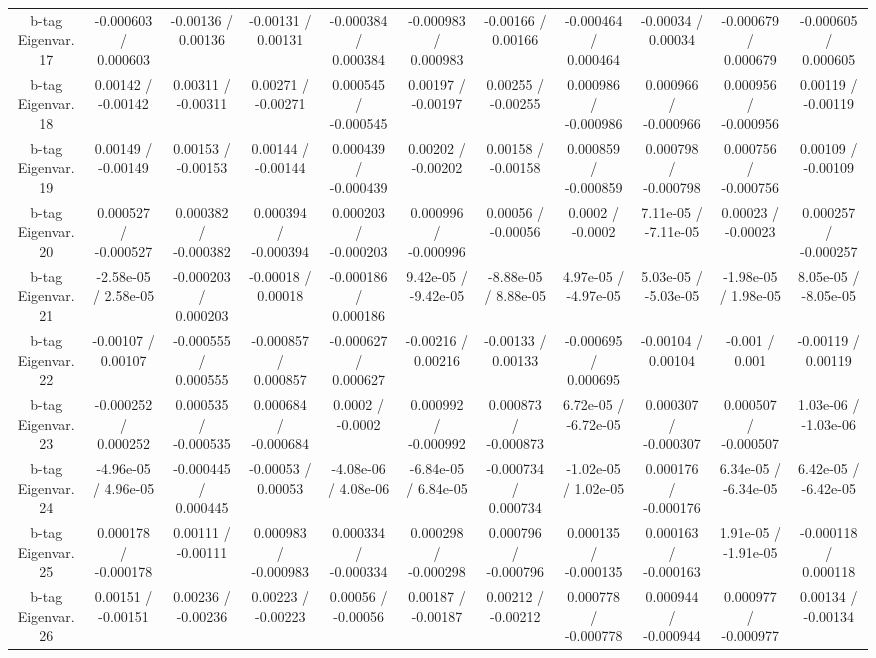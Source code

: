 \begin{table}[htbp]
\begin{center}
\begin{tabular}{|c|c|c|c|c|c|c|c|c|c|c|}
  b-tag Eigenvar. 17 & -0.000603 / 0.000603 & -0.00136 / 0.00136 & -0.00131 / 0.00131 & -0.000384 / 0.000384 & -0.000983 / 0.000983 & -0.00166 / 0.00166 & -0.000464 / 0.000464 & -0.00034 / 0.00034 & -0.000679 / 0.000679 & -0.000605 / 0.000605 \\ 
  b-tag Eigenvar. 18 & 0.00142 / -0.00142 & 0.00311 / -0.00311 & 0.00271 / -0.00271 & 0.000545 / -0.000545 & 0.00197 / -0.00197 & 0.00255 / -0.00255 & 0.000986 / -0.000986 & 0.000966 / -0.000966 & 0.000956 / -0.000956 & 0.00119 / -0.00119 \\ 
  b-tag Eigenvar. 19 & 0.00149 / -0.00149 & 0.00153 / -0.00153 & 0.00144 / -0.00144 & 0.000439 / -0.000439 & 0.00202 / -0.00202 & 0.00158 / -0.00158 & 0.000859 / -0.000859 & 0.000798 / -0.000798 & 0.000756 / -0.000756 & 0.00109 / -0.00109 \\ 
  b-tag Eigenvar. 20 & 0.000527 / -0.000527 & 0.000382 / -0.000382 & 0.000394 / -0.000394 & 0.000203 / -0.000203 & 0.000996 / -0.000996 & 0.00056 / -0.00056 & 0.0002 / -0.0002 & 7.11e-05 / -7.11e-05 & 0.00023 / -0.00023 & 0.000257 / -0.000257 \\ 
  b-tag Eigenvar. 21 & -2.58e-05 / 2.58e-05 & -0.000203 / 0.000203 & -0.00018 / 0.00018 & -0.000186 / 0.000186 & 9.42e-05 / -9.42e-05 & -8.88e-05 / 8.88e-05 & 4.97e-05 / -4.97e-05 & 5.03e-05 / -5.03e-05 & -1.98e-05 / 1.98e-05 & 8.05e-05 / -8.05e-05 \\ 
  b-tag Eigenvar. 22 & -0.00107 / 0.00107 & -0.000555 / 0.000555 & -0.000857 / 0.000857 & -0.000627 / 0.000627 & -0.00216 / 0.00216 & -0.00133 / 0.00133 & -0.000695 / 0.000695 & -0.00104 / 0.00104 & -0.001 / 0.001 & -0.00119 / 0.00119 \\ 
  b-tag Eigenvar. 23 & -0.000252 / 0.000252 & 0.000535 / -0.000535 & 0.000684 / -0.000684 & 0.0002 / -0.0002 & 0.000992 / -0.000992 & 0.000873 / -0.000873 & 6.72e-05 / -6.72e-05 & 0.000307 / -0.000307 & 0.000507 / -0.000507 & 1.03e-06 / -1.03e-06 \\ 
  b-tag Eigenvar. 24 & -4.96e-05 / 4.96e-05 & -0.000445 / 0.000445 & -0.00053 / 0.00053 & -4.08e-06 / 4.08e-06 & -6.84e-05 / 6.84e-05 & -0.000734 / 0.000734 & -1.02e-05 / 1.02e-05 & 0.000176 / -0.000176 & 6.34e-05 / -6.34e-05 & 6.42e-05 / -6.42e-05 \\ 
  b-tag Eigenvar. 25 & 0.000178 / -0.000178 & 0.00111 / -0.00111 & 0.000983 / -0.000983 & 0.000334 / -0.000334 & 0.000298 / -0.000298 & 0.000796 / -0.000796 & 0.000135 / -0.000135 & 0.000163 / -0.000163 & 1.91e-05 / -1.91e-05 & -0.000118 / 0.000118 \\ 
  b-tag Eigenvar. 26 & 0.00151 / -0.00151 & 0.00236 / -0.00236 & 0.00223 / -0.00223 & 0.00056 / -0.00056 & 0.00187 / -0.00187 & 0.00212 / -0.00212 & 0.000778 / -0.000778 & 0.000944 / -0.000944 & 0.000977 / -0.000977 & 0.00134 / -0.00134 \\ 

\end{tabular}
\end{center}
\end{table}
